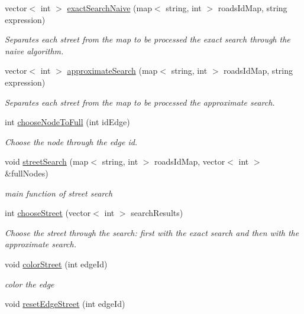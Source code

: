 \begin{DoxyCompactItemize}
vector$<$ int $>$ \hyperlink{classSmartWaste_aca7293f5975100c00c7b915354520af5}{exact\+Search\+Naive} (map$<$ string, int $>$ roads\+Id\+Map, string expression)
\begin{DoxyCompactList}\small\item\em Separates each street from the map to be processed the exact search through the naive algorithm. \end{DoxyCompactList}\item 
vector$<$ int $>$ \hyperlink{classSmartWaste_a72bb77116d7a8bccb121172c27a3cd9c}{approximate\+Search} (map$<$ string, int $>$ roads\+Id\+Map, string expression)
\begin{DoxyCompactList}\small\item\em Separates each street from the map to be processed the approximate search. \end{DoxyCompactList}\item 
int \hyperlink{classSmartWaste_aaa2ba41023879d615dd60fb52126d213}{choose\+Node\+To\+Full} (int id\+Edge)
\begin{DoxyCompactList}\small\item\em Choose the node through the edge id. \end{DoxyCompactList}\item 
void \hyperlink{classSmartWaste_aa78c4f2e275c9fc4d1735900f88c4fda}{street\+Search} (map$<$ string, int $>$ roads\+Id\+Map, vector$<$ int $>$ \&full\+Nodes)
\begin{DoxyCompactList}\small\item\em main function of street search \end{DoxyCompactList}\item 
int \hyperlink{classSmartWaste_a77a8207530b931703036025cea8092a4}{choose\+Street} (vector$<$ int $>$ search\+Results)
\begin{DoxyCompactList}\small\item\em Choose the street through the search\+: first with the exact search and then with the approximate search. \end{DoxyCompactList}\item 
void \hyperlink{classSmartWaste_a5317d1e3b89416d622435be6100e0faf}{color\+Street} (int edge\+Id)
\begin{DoxyCompactList}\small\item\em color the edge \end{DoxyCompactList}\item 
void \hyperlink{classSmartWaste_ac4ab9e2882b20d1e99bf4f6b8388a811}{reset\+Edge\+Street} (int edge\+Id)

\end{DoxyCompactItemize}
